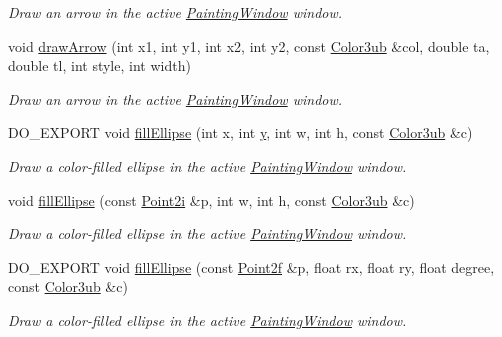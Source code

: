 \begin{DoxyCompactItemize}
\begin{DoxyCompactList}\small\item\em Draw an arrow in the active \hyperlink{class_d_o_1_1_painting_window}{Painting\-Window} window. \end{DoxyCompactList}\item 
void \hyperlink{group___draw2_d_ga23b2f26a1d7ffaa2c1e72aedeaa76dfa}{draw\-Arrow} (int x1, int y1, int x2, int y2, const \hyperlink{group___color_types_ga018b76cd00a4f9dca7dd06246d5bd3aa}{Color3ub} \&col, double ta, double tl, int style, int width)
\begin{DoxyCompactList}\small\item\em Draw an arrow in the active \hyperlink{class_d_o_1_1_painting_window}{Painting\-Window} window. \end{DoxyCompactList}\item 
D\-O\-\_\-\-E\-X\-P\-O\-R\-T void \hyperlink{group___draw2_d_ga3ed03162b6c7f9878b29744b4ff93d08}{fill\-Ellipse} (int x, int \hyperlink{group___channel_accessors_gac90c52c5b3a7b2a7e3761e6e84f25778}{y}, int w, int h, const \hyperlink{group___color_types_ga018b76cd00a4f9dca7dd06246d5bd3aa}{Color3ub} \&c)
\begin{DoxyCompactList}\small\item\em Draw a color-\/filled ellipse in the active \hyperlink{class_d_o_1_1_painting_window}{Painting\-Window} window. \end{DoxyCompactList}\item 
void \hyperlink{group___draw2_d_ga857cc343c89d77047513cfffec925d83}{fill\-Ellipse} (const \hyperlink{group___eigen_typedefs_ga048a27763e58f682b1b91af86144f701}{Point2i} \&p, int w, int h, const \hyperlink{group___color_types_ga018b76cd00a4f9dca7dd06246d5bd3aa}{Color3ub} \&c)
\begin{DoxyCompactList}\small\item\em Draw a color-\/filled ellipse in the active \hyperlink{class_d_o_1_1_painting_window}{Painting\-Window} window. \end{DoxyCompactList}\item 
D\-O\-\_\-\-E\-X\-P\-O\-R\-T void \hyperlink{group___draw2_d_ga0cd7ab76249b31006f12efb89e96930a}{fill\-Ellipse} (const \hyperlink{group___eigen_typedefs_ga02df8c02295a7722cc3f5b89e8137464}{Point2f} \&p, float rx, float ry, float degree, const \hyperlink{group___color_types_ga018b76cd00a4f9dca7dd06246d5bd3aa}{Color3ub} \&c)
\begin{DoxyCompactList}\small\item\em Draw a color-\/filled ellipse in the active \hyperlink{class_d_o_1_1_painting_window}{Painting\-Window} window. \end{DoxyCompactList}\item 

\end{DoxyCompactItemize}
